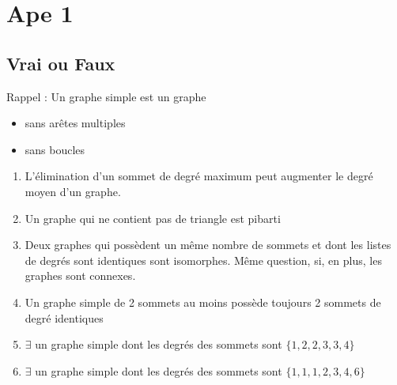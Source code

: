 \section{Ape 1}

\subsection{Vrai ou Faux}
Rappel : Un graphe simple est un graphe
\begin{itemize}
\item sans arêtes multiples
\item sans boucles
 \end{itemize}
\begin{enumerate}
	\item{L'élimination d'un sommet de degré maximum peut augmenter le degré moyen d'un graphe.}
	\item{Un graphe qui ne contient pas de triangle est pibarti}
	\item{Deux graphes qui possèdent un même nombre de sommets et dont les listes de degrés sont identiques sont isomorphes. Même question, si, en plus, les graphes sont connexes.}
	\item{Un graphe simple de 2 sommets au moins possède toujours 2 sommets de degré identiques}
	\item{$\exists$ un graphe simple dont les degrés des sommets sont $\{1,2,2,3,3,4\}$}
	\item{$\exists$ un graphe simple dont les degrés des sommets sont $\{1,1,1,2,3,4,6\}$}	
\end{enumerate}

